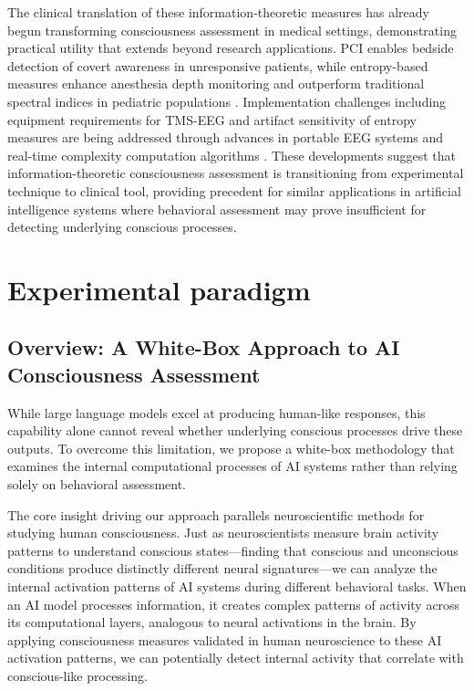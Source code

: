 \documentclass[11pt,a4paper]{article}
\begin{document}
The clinical translation of these information-theoretic measures has already begun transforming consciousness assessment in medical settings, demonstrating practical utility that extends beyond research applications. PCI enables bedside detection of covert awareness in unresponsive patients, while entropy-based measures enhance anesthesia depth monitoring and outperform traditional spectral indices in pediatric populations \citep{Casarotto2016, Zhang2001}. Implementation challenges including equipment requirements for TMS-EEG and artifact sensitivity of entropy measures are being addressed through advances in portable EEG systems and real-time complexity computation algorithms \citep{Sarasso2021}. These developments suggest that information-theoretic consciousness assessment is transitioning from experimental technique to clinical tool, providing precedent for similar applications in artificial intelligence systems where behavioral assessment may prove insufficient for detecting underlying conscious processes.

\section{Experimental paradigm}
\label{sec:experimental_paradigm}

\subsection{Overview: A White-Box Approach to AI Consciousness Assessment}

While large language models excel at producing human-like responses, this capability alone cannot reveal whether underlying conscious processes drive these outputs. To overcome this limitation, we propose a white-box methodology that examines the internal computational processes of AI systems rather than relying solely on behavioral assessment.

The core insight driving our approach parallels neuroscientific methods for studying human consciousness. Just as neuroscientists measure brain activity patterns to understand conscious states—finding that conscious and unconscious conditions produce distinctly different neural signatures—we can analyze the internal activation patterns of AI systems during different behavioral tasks. When an AI model processes information, it creates complex patterns of activity across its computational layers, analogous to neural activations in the brain. By applying consciousness measures validated in human neuroscience to these AI activation patterns, we can potentially detect internal activity that correlate with conscious-like processing.
\end{document}

